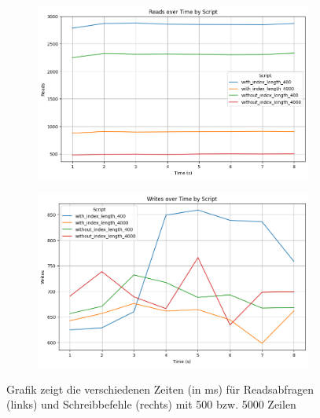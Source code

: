 \begin{figure}[!ht]
    \centering
    \begin{subfigure}[t]{0.48\textwidth}
        \centering
        \includegraphics[width=\textwidth]{PNGs/Script/Index/B_Tree/high-count/Reads}
        \label{high-reads}
    \end{subfigure}
    \hfill
    \begin{subfigure}[t]{0.48\textwidth}
        \centering
        \includegraphics[width=\textwidth]{PNGs/Script/Index/B_Tree/high-count/Writes}
        \label{high-writes}
    \end{subfigure}
    \caption[High-Counts: Reads und Writes]{Grafik zeigt die verschiedenen Zeiten (in ms) für Readsabfragen (links) und Schreibbefehle (rechts) mit 500 bzw. 5000 Zeilen}
    \label{fig:high-b-tree-columns}
\end{figure}

